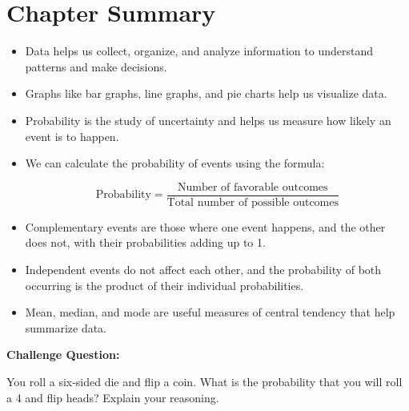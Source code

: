 \section{Chapter Summary}
\begin{itemize}
    \item Data helps us collect, organize, and analyze information to understand patterns and make decisions.
    \item Graphs like bar graphs, line graphs, and pie charts help us visualize data.
    \item Probability is the study of uncertainty and helps us measure how likely an event is to happen.
    \item We can calculate the probability of events using the formula: 
    
    \[
    \text{Probability} = \frac{\text{Number of favorable outcomes}}{\text{Total number of possible outcomes}}
    \]
    
    \item Complementary events are those where one event happens, and the other does not, with their probabilities adding up to 1.
    \item Independent events do not affect each other, and the probability of both occurring is the product of their individual probabilities.
    \item Mean, median, and mode are useful measures of central tendency that help summarize data.
\end{itemize}

\textbf{Challenge Question:}

You roll a six-sided die and flip a coin. What is the probability that you will roll a 4 and flip heads? Explain your reasoning.